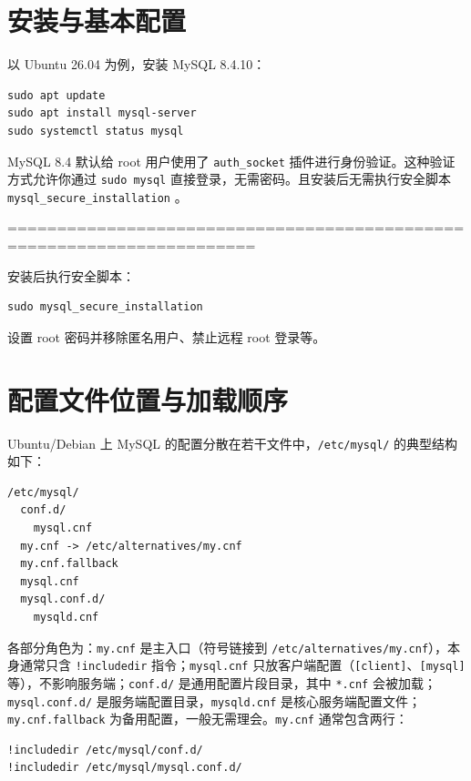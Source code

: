 \documentclass[12pt,UTF8]{ctexbook}
\begin{document}
\section{安装与基本配置}

以 Ubuntu 26.04 为例，安装 MySQL 8.4.10：

\begin{lstlisting}
sudo apt update
sudo apt install mysql-server
sudo systemctl status mysql
\end{lstlisting}

MySQL 8.4 默认给 root 用户使用了 \texttt{auth\_socket} 插件进行身份验证。这种验证方式允许你通过 \texttt{sudo mysql} 直接登录，无需密码。且安装后无需执行安全脚本 \texttt{mysql\_secure\_installation} 。

=======================================================================

安装后执行安全脚本：

\begin{lstlisting}
sudo mysql_secure_installation
\end{lstlisting}

设置 root 密码并移除匿名用户、禁止远程 root 登录等。

\section{配置文件位置与加载顺序}
\label{sec:config-files}

Ubuntu/Debian 上 MySQL 的配置分散在若干文件中，\texttt{/etc/mysql/} 的典型结构如下：

\begin{lstlisting}
/etc/mysql/
  conf.d/
    mysql.cnf
  my.cnf -> /etc/alternatives/my.cnf
  my.cnf.fallback
  mysql.cnf
  mysql.conf.d/
    mysqld.cnf
\end{lstlisting}

各部分角色为：\texttt{my.cnf} 是主入口（符号链接到 \texttt{/etc/alternatives/my.cnf}），本身通常只含 \texttt{!includedir} 指令；\texttt{mysql.cnf} 只放客户端配置（\texttt{[client]}、\texttt{[mysql]} 等），不影响服务端；\texttt{conf.d/} 是通用配置片段目录，其中 \texttt{*.cnf} 会被加载；\texttt{mysql.conf.d/} 是服务端配置目录，\texttt{mysqld.cnf} 是核心服务端配置文件；\texttt{my.cnf.fallback} 为备用配置，一般无需理会。\texttt{my.cnf} 通常包含两行：

\begin{lstlisting}
!includedir /etc/mysql/conf.d/
!includedir /etc/mysql/mysql.conf.d/
\end{lstlisting}
\end{document}
